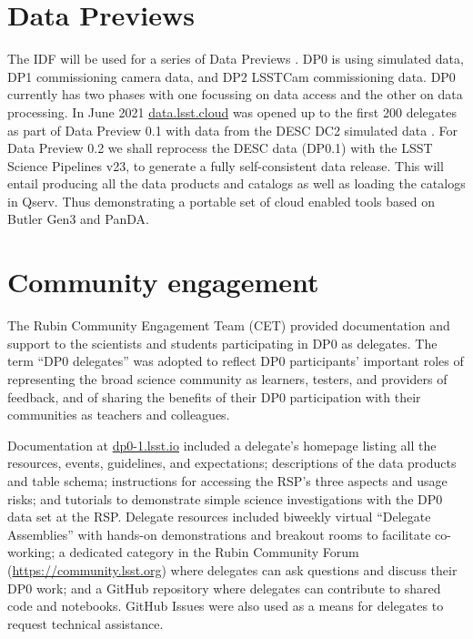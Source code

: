 \documentclass[11pt,twoside]{article}
\begin{document}
\section {Data Previews}
The IDF will be used for a series of Data Previews \citep[DP;][]{RDO-011}. DP0 is using simulated data, DP1 commissioning camera data,
and DP2 LSSTCam commissioning data. DP0 currently has two phases\citep{RTN-001} with one focussing on data access and the other on data processing.
In June 2021 \href{https://data.lsst.cloud}{data.lsst.cloud} was opened up to the first 200 delegates as part of Data Preview 0.1 with data from the DESC DC2 simulated data \citep{arXiv:2010.05926}.
For Data Preview 0.2 we shall reprocess the DESC data (DP0.1) with the LSST Science Pipelines v23, to generate a fully self-consistent data release.
This will entail producing all the data products and catalogs as well as loading the  catalogs in Qserv.
Thus demonstrating a portable set of cloud enabled tools based on Butler Gen3 \citep{2019ASPC..523..653J} and PanDA.

\section{Community engagement }
The Rubin Community Engagement Team (CET) provided documentation and support to the scientists and students participating in DP0 as delegates.
The term ``DP0 delegates'' was adopted to reflect DP0 participants’ important roles of representing the broad science community as learners, testers, and providers of feedback, and of sharing the benefits of their DP0 participation with their communities as teachers and colleagues.

Documentation at \href{https://dp0-1.lsst.io}{dp0-1.lsst.io} included a delegate's homepage listing all the resources, events, guidelines, and expectations; descriptions of the data products and table schema; instructions for accessing the RSP's three aspects and usage risks; and tutorials to demonstrate simple science investigations with the DP0 data set at the RSP.
Delegate resources included biweekly virtual ``Delegate Assemblies'' with hands-on demonstrations and breakout rooms to facilitate co-working; a dedicated category in the Rubin Community Forum (\url{https://community.lsst.org}) where delegates can ask questions and discuss their DP0 work; and a GitHub repository where delegates can contribute to shared code and notebooks.
GitHub Issues were also used as a means for delegates to request technical assistance.
\end{document}
